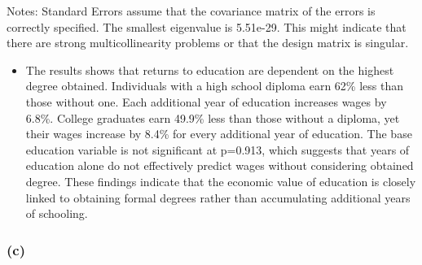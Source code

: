 \documentclass[
  letterpaper,
  DIV=11,
  numbers=noendperiod]{scrartcl}
\providecommand{\tightlist}{%
  \setlength{\itemsep}{0pt}\setlength{\parskip}{0pt}}\usepackage{longtable,booktabs,array}
\begin{document}
Notes: \newline
 [1] Standard Errors assume that the covariance matrix of the errors is correctly specified. \newline
 [2] The smallest eigenvalue is 5.51e-29. This might indicate that there are \newline
 strong multicollinearity problems or that the design matrix is singular.

\begin{itemize}
\tightlist
\item
  The results shows that returns to education are dependent on the
  highest degree obtained. Individuals with a high school diploma earn
  62\% less than those without one. Each additional year of education
  increases wages by 6.8\%. College graduates earn 49.9\% less than
  those without a diploma, yet their wages increase by 8.4\% for every
  additional year of education. The base education variable is not
  significant at p=0.913, which suggests that years of education alone
  do not effectively predict wages without considering obtained degree.
  These findings indicate that the economic value of education is
  closely linked to obtaining formal degrees rather than accumulating
  additional years of schooling.
\end{itemize}

\subsubsection{(c)}\label{c-2}
\end{document}
